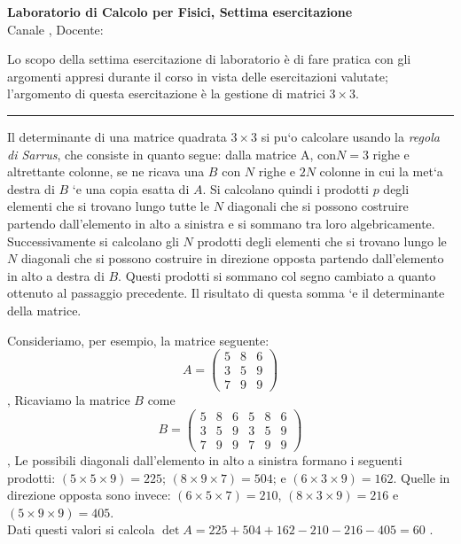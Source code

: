 \documentclass[11pt]{article}
\begin{document}
\pagestyle{empty}

\begin{center}
{\Large \bf  Laboratorio di Calcolo per Fisici, Settima esercitazione\\[2mm]}
{\large Canale \canale, Docente: \docente}
\end{center}
\vspace{4mm}

\begin{mdframed}[backgroundcolor=gray!10]
  Lo scopo della settima esercitazione di laboratorio \`e di fare pratica con
gli argomenti appresi durante il corso in vista delle esercitazioni valutate;
l'argomento di questa esercitazione \`e la gestione di matrici $3 \times 3$.
  \end{mdframed}
%
%



\hrule
\vspace{2mm}
Il determinante di una matrice quadrata $3 \times 3$ si pu`o calcolare usando la {\em regola di Sarrus}, che consiste in quanto segue: dalla matrice A, con$ N \! = \!  3$ righe 
e altrettante colonne, se ne ricava una $B$ con $N$ righe e $2N$ colonne in
cui la met`a destra di $B$ `e una copia esatta di $A$. Si calcolano quindi i prodotti $p$ degli elementi che si trovano
lungo tutte le $N$ diagonali che si possono costruire partendo dall’elemento in alto a sinistra e si sommano tra loro
algebricamente. Successivamente si calcolano gli $N$ prodotti degli elementi che si trovano lungo le $N$ diagonali che
si possono costruire in direzione opposta partendo dall’elemento in alto a destra di $B$. Questi prodotti si sommano
col segno cambiato a quanto ottenuto al passaggio precedente. Il risultato di questa somma `e il determinante della
matrice.

Consideriamo, per esempio, la matrice seguente:
\[
A = \left(\begin{array}{ccc}
5 &8& 6\\
3 &5 &9\\
7 & 9 & 9
\end{array}
\right)
\]
‚
Ricaviamo la matrice $B$ come
\[
B = \left(\begin{array}{cccccc}
5 & 8 & 6 &5 & 8 & 6\\
3 & 5 & 9 &3 &5  &9\\
7 & 9 & 9 &7 &9 & 9
\end{array}
\right)
\]
‚
Le possibili diagonali dall’elemento in alto a sinistra formano i seguenti prodotti: $(5 \times 5 \times 9)= 225$;
$(8 \times 9 \times 7)= 504$; 
e $(6\times3\times9)=162$. Quelle in direzione opposta sono invece: 
$(6\times5\times7)=210$, $(8\times3\times9)=216$ e $(5\times9\times9)=405$.
\\
Dati questi valori si calcola
$\det A = 225 + 504 +162 - 210 - 216 -405= 60$ .
\end{document}
